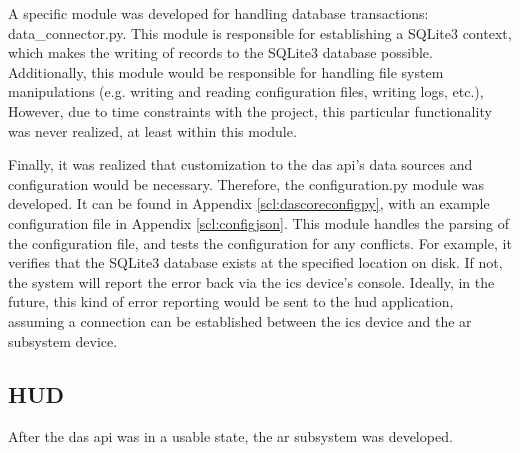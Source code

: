             \par A specific module was developed for handling database transactions: data\_connector.py. This module is responsible for establishing a SQLite3 context, which makes the writing of records to the SQLite3 database possible. Additionally, this module would be responsible for handling file system manipulations (e.g. writing and reading configuration files, writing logs, etc.), However, due to time constraints with the project, this particular functionality was never realized, at least within this module.

            \par Finally, it was realized that customization to the \gls{das} \gls{api}'s data sources and configuration would be necessary. Therefore, the configuration.py module was developed. It can be found in Appendix \ref{scl:dascoreconfigpy}, with an example configuration file in Appendix \ref{scl:configjson}. This module handles the parsing of the configuration file, and tests the configuration for any conflicts. For example, it verifies that the SQLite3 database exists at the specified location on disk. If not, the system will report the error back via the \gls{ics} device's console. Ideally, in the future, this kind of error reporting would be sent to the \gls{hud} application, assuming a connection can be established between the \gls{ics} device and the \gls{ar} subsystem device.

    \subsection{HUD}
        \par After the \gls{das} \gls{api} was in a usable state, the \gls{ar} subsystem was developed.

